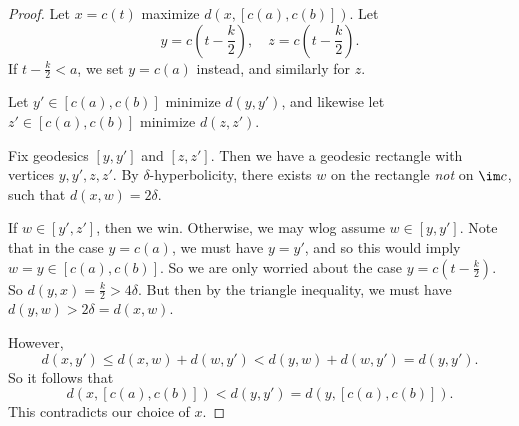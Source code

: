 \documentclass[a4paper]{article}
\begin{document}
\begin{proof}
  Let $x = c(t)$ maximize $d(x, [c(a), c(b)])$. Let
  \[
    y = c\left(t - \frac{k}{2}\right),\quad z = c\left(t - \frac{k}{2}\right).
  \]
  If $t - \frac{k}{2} < a$, we set $y = c(a)$ instead, and similarly for $z$.

  Let $y' \in [c(a), c(b)]$ minimize $d(y, y')$, and likewise let $z' \in [c(a), c(b)]$ minimize $d(z, z')$.
  \begin{center}
  \end{center}

  Fix geodesics $[y, y']$ and $[z, z']$. Then we have a geodesic rectangle with vertices $y, y', z, z'$. By $\delta$-hyperbolicity, there exists $w$ on the rectangle \emph{not} on $\im c$, such that $d(x, w) = 2 \delta$.

  If $w \in [y', z']$, then we win. Otherwise, we may wlog assume $w \in [y, y']$. Note that in the case $y = c(a)$, we must have $y = y'$, and so this would imply $w = y \in [c(a), c(b)]$. So we are only worried about the case $y = c\left(t - \frac{k}{2}\right)$. So $d(y, x) = \frac{k}{2} > 4\delta$. But then by the triangle inequality, we must have $d(y, w) > 2\delta = d(x, w)$.

  However,
  \[
    d(x, y') \leq d(x, w) + d(w, y') < d(y, w) + d(w, y') = d(y, y').
  \]
  So it follows that
  \[
    d(x, [c(a), c(b)]) < d(y, y') = d(y, [c(a), c(b)]).
  \]
  This contradicts our choice of $x$.
\end{proof}
\end{document}
